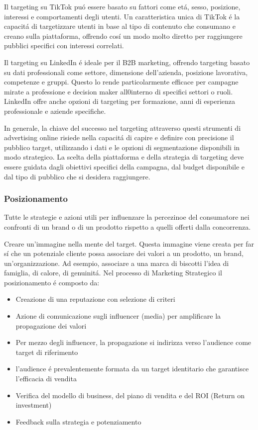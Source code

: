\documentclass{article}
\begin{document}
Il targeting su TikTok pu\'o essere basato su fattori come et\'a, sesso, posizione, interessi e comportamenti degli utenti. Un caratteristica unica di TikTok \'e la capacit\'a di targetizzare utenti in base al tipo di contenuto che consumano e creano sulla piattaforma, offrendo cos\'i un modo molto diretto per raggiungere pubblici specifici con interessi correlati.

Il targeting su LinkedIn \'e ideale per il B2B marketing, offrendo targeting basato su dati professionali come settore, dimensione dell'azienda, posizione lavorativa, competenze e gruppi. Questo lo rende particolarmente efficace per campagne mirate a professione e decision maker all0interno di specifici settori o ruoli. LinkedIn offre anche opzioni di targeting per formazione, anni di esperienza professionale e aziende specifiche.

In generale, la chiave del successo nel targeting attraverso questi strumenti di advertising online risiede nella capacit\'a di capire e definire con precisione il pubblico target, utilizzando i dati e le opzioni di segmentazione disponibili in modo strategico. La scelta della piattaforma e della strategia di targeting deve essere guidata dagli obiettivi specifici della campagna, dal budget disponibile e dal tipo di pubblico che si desidera raggiungere.

\subsubsection{Posizionamento}
Tutte le strategie e azioni utili per influenzare la percezinoe del consumatore nei confronti di un brand o di un prodotto rispetto a quelli offerti dalla concorrenza.

Creare un'immagine nella mente del target. Questa immagine viene creata per far s\'i che un potenziale cliente possa associare dei valori a un prodotto, un brand, un'organizzazione. Ad esempio, associare a una marca di biscotti l'idea di famiglia, di calore, di genuinit\'a. Nel processo di Marketing  Strategico il posizionamento \'e composto da:

\begin{itemize}
    \item Creazione di una reputazione con selezione di criteri
    \item Azione di comunicazione sugli influencer (media) per amplificare la propagazione dei valori
    \item Per mezzo degli influencer, la propagazione si indirizza verso l'audience come target di riferimento
    \item l'audience \'e prevalentemente formata da un target identitario che garantisce l'efficacia di vendita
    \item Verifica del modello di business, del piano di vendita e del ROI (Return on investment)
    \item Feedback sulla strategia e potenziamento
\end{itemize}
\end{document}

